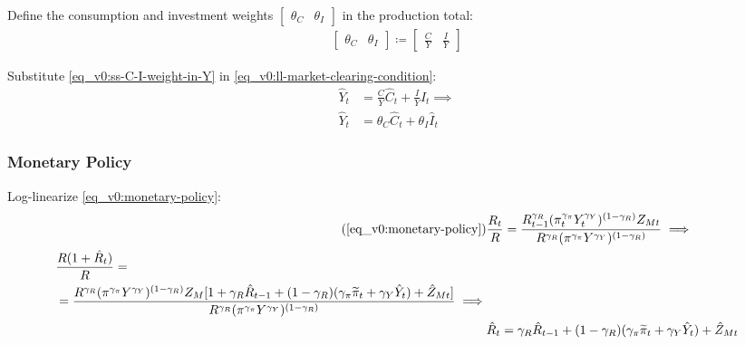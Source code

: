 \documentclass[../thesis.tex]{subfiles}
\begin{document}
	Define the consumption and investment weights $\left[ \begin{smallmatrix} \theta_C & \theta_I \end{smallmatrix} \right] $ in the production total:
	\begin{align}
		\label{eq_v0:ss-C-I-weight-in-Y}
		\begin{bmatrix}
			\theta_C & \theta_I
		\end{bmatrix} \coloneq 
		\begin{bmatrix}
			\displaystyle \frac{C}{Y} & \displaystyle \frac{I}{Y}
		\end{bmatrix}
	\end{align}
	
	Substitute \ref{eq_v0:ss-C-I-weight-in-Y} in \ref{eq_v0:ll-market-clearing-condition}:
	\begin{align}
		\hat{Y}_t &= \frac{C}{Y}\hat{C}_t + \frac{I}{Y}\hat{I}_t \implies \nonumber \\
		\hat{Y}_t &= \theta_C \hat{C}_t + \theta_I \hat{I}_t 
		\label{eq_v0:ll-market-clearing-condition-theta}
	\end{align}
	
	
	
	
	\subsubsection*{Monetary Policy}
	
	Log-linearize \ref{eq_v0:monetary-policy}:
	\begin{align}
		\tag{\ref{eq_v0:monetary-policy}}
		& \frac{R_t}{R} = \frac{R_{t-1}^{\gamma_R} (\pi_t^{\gamma_\pi} Y_t^{\gamma_Y})^{(1-\gamma_R)} Z_{Mt}}{R^{\gamma_R} (\pi^{\gamma_\pi} Y^{\gamma_Y})^{(1-\gamma_R)}} \implies \\
		\begin{split}
			& \frac{R(1+ \hat{R}_t)}{R} = \\
			&= \frac{ R^{\gamma_R} (\pi^{\gamma_\pi} Y^{\gamma_Y})^{(1-\gamma_R)} Z_{M} [1+ \gamma_R \hat{R}_{t-1} + (1-\gamma_R)(\gamma_\pi \widetilde{\pi}_t + \gamma_Y \hat{Y}_t) + \hat{Z}_{Mt}]}{R^{\gamma_R} (\pi^{\gamma_\pi} Y^{\gamma_Y})^{(1-\gamma_R)}} \implies
		\end{split} \nonumber \\
		& \hat{R}_t = \gamma_R \hat{R}_{t-1} + (1-\gamma_R)(\gamma_\pi \widetilde{\pi}_t + \gamma_Y \hat{Y}_t) + \hat{Z}_{Mt} \label{eq_v0:ll-monetary-policy}
	\end{align}
	
\end{document}
